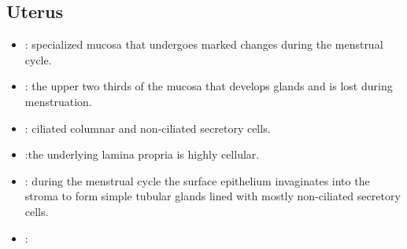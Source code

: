 \subsection{Uterus}
\begin{center}
\end{center}
\begin{multicols}{2}
\begin{itemize}
  \item {}: specialized mucosa that undergoes marked changes during the menstrual cycle. 
  
  \begin{center}
  \end{center}
  
  \item {}: the upper two thirds of the mucosa that develops glands and is lost during menstruation. 
  
  \begin{center}
  \end{center}
  
  \item {}: ciliated columnar and non-ciliated secretory cells.
  
  \begin{center}
  \end{center}
  
  \item {}:the underlying lamina propria is highly cellular.
  
  \begin{center}
  \end{center}
  
  \item {}:  during the menstrual cycle the surface epithelium invaginates into the stroma to form simple tubular glands lined with mostly non-ciliated secretory cells.
  
  \begin{center}
  \end{center}
  
  \item {}:
  

\end{itemize}
\end{multicols}
